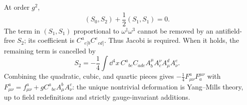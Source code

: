 \begin{enumerate}
  At order \(g^2\),
  \[
    (S_0,S_2)+\frac12(S_1,S_1)=0.
  \]
  The term in \((S_1,S_1)\) proportional to
  \(\omega^\ddagger\omega^3\) cannot be removed by an antifield-free
  \(S_2\); its coefficient is
  \(C^a{}_{e[b}C^e{}_{cd]}\).  Thus Jacobi is required.  When it holds, the
  remaining term is cancelled by
  \[
    S_2=-\frac14\int \dd^4x\,
      C^a{}_{bc}C_{ade}
      A_b^\mu A_c^\nu A^d_\mu A^e_\nu .
  \]
  Combining the quadratic, cubic, and quartic pieces gives
  \(-\tfrac14F^a_{\mu\nu}F_a^{\mu\nu}\) with
  \(F^a_{\mu\nu}=f^a_{\mu\nu}
  +gC^a{}_{bc}A^b_\mu A^c_\nu\): the unique nontrivial deformation is
  Yang--Mills theory, up to field redefinitions and strictly
  gauge-invariant additions.

\end{enumerate}

